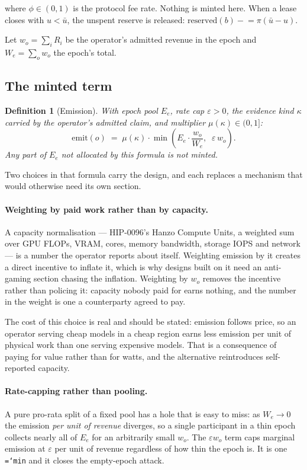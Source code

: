 \documentclass[11pt,a4paper]{article}
\newtheorem{definition}{Definition}[section]
\newcommand{\code}[1]{\texttt{\hyphenchar\font=`\-\relax #1}}
\newcommand{\res}{\mathrm{reserved}}
\newcommand{\emit}{\mathrm{emit}}
\begin{document}
where $\phi \in (0,1)$ is the protocol fee rate. Nothing is minted here. When a
lease closes with $u < \bar u$, the unspent reserve is released:
$\res(b) \mathrel{-}= \pi(\bar u - u)$.

Let $w_o = \sum_i R_i$ be the operator's admitted revenue in the epoch and
$W_e = \sum_{o} w_o$ the epoch's total.

\subsection{The minted term}

\begin{definition}[Emission]
\label{def:emit}
With epoch pool $E_e$, rate cap $\varepsilon > 0$, the evidence kind $\kappa$
carried by the operator's admitted claim, and multiplier
$\mu(\kappa) \in (0,1]$:
\[
  \emit(o) \;=\; \mu(\kappa)\cdot
    \min\!\left( E_e \cdot \frac{w_o}{W_e},\;\; \varepsilon\, w_o \right).
\]
Any part of $E_e$ not allocated by this formula is not minted.
\end{definition}

Two choices in that formula carry the design, and each replaces a mechanism that
would otherwise need its own section.

\paragraph{Weighting by paid work rather than by capacity.} A capacity
normalisation --- HIP-0096's Hanzo Compute Units, a weighted sum over GPU FLOPs,
VRAM, cores, memory bandwidth, storage IOPS and network --- is a number the
operator reports about itself. Weighting emission by it creates a direct
incentive to inflate it, which is why designs built on it need an anti-gaming
section chasing the inflation. Weighting by $w_o$ removes the incentive rather
than policing it: capacity nobody paid for earns nothing, and the number in the
weight is one a counterparty agreed to pay.

The cost of this choice is real and should be stated: emission follows price, so
an operator serving cheap models in a cheap region earns less emission per unit
of physical work than one serving expensive models. That is a consequence of
paying for value rather than for watts, and the alternative reintroduces
self-reported capacity.

\paragraph{Rate-capping rather than pooling.} A pure pro-rata split of a fixed
pool has a hole that is easy to miss: as $W_e \to 0$ the emission \emph{per unit
of revenue} diverges, so a single participant in a thin epoch collects nearly all
of $E_e$ for an arbitrarily small $w_o$. The $\varepsilon w_o$ term caps marginal
emission at $\varepsilon$ per unit of revenue regardless of how thin the epoch
is. It is one \code{min} and it closes the empty-epoch attack.
\end{document}
